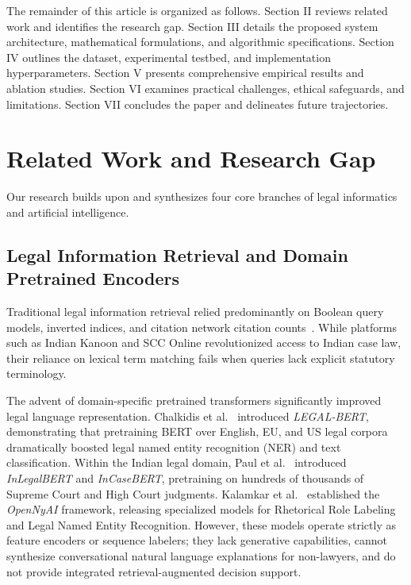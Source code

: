 \documentclass[conference]{IEEEtran}
\begin{document}
The remainder of this article is organized as follows. Section II reviews related work and identifies the research gap. Section III details the proposed system architecture, mathematical formulations, and algorithmic specifications. Section IV outlines the dataset, experimental testbed, and implementation hyperparameters. Section V presents comprehensive empirical results and ablation studies. Section VI examines practical challenges, ethical safeguards, and limitations. Section VII concludes the paper and delineates future trajectories.

\section{Related Work and Research Gap}
Our research builds upon and synthesizes four core branches of legal informatics and artificial intelligence.

\subsection{Legal Information Retrieval and Domain Pretrained Encoders}
Traditional legal information retrieval relied predominantly on Boolean query models, inverted indices, and citation network citation counts~\cite{katz2012rethinking}. While platforms such as Indian Kanoon and SCC Online revolutionized access to Indian case law, their reliance on lexical term matching fails when queries lack explicit statutory terminology. 

The advent of domain-specific pretrained transformers significantly improved legal language representation. Chalkidis et al.~\cite{chalkidis2020legal} introduced \textit{LEGAL-BERT}, demonstrating that pretraining BERT over English, EU, and US legal corpora dramatically boosted legal named entity recognition (NER) and text classification. Within the Indian legal domain, Paul et al.~\cite{paul2022pre} introduced \textit{InLegalBERT} and \textit{InCaseBERT}, pretraining on hundreds of thousands of Supreme Court and High Court judgments. Kalamkar et al.~\cite{kalamkar2022corpus} established the \textit{OpenNyAI} framework, releasing specialized models for Rhetorical Role Labeling and Legal Named Entity Recognition. However, these models operate strictly as feature encoders or sequence labelers; they lack generative capabilities, cannot synthesize conversational natural language explanations for non-lawyers, and do not provide integrated retrieval-augmented decision support.
\end{document}
